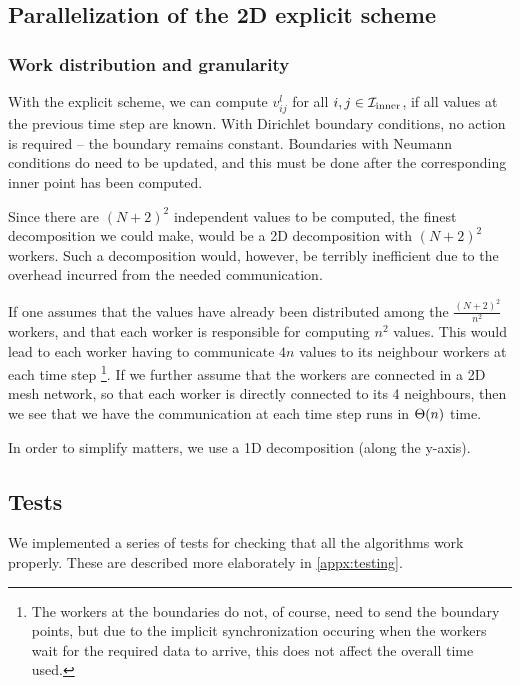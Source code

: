 \subsection{Parallelization of the 2D explicit scheme}
\subsubsection{Work distribution and granularity}
\cite{inf3380_bok}
With the explicit scheme, we can compute $v_{ij}^l$ for all $i, j \in \mathcal{I}_{\mathrm{inner}}$, if all values at the previous time step are known. With Dirichlet boundary conditions, no action is required -- the boundary remains constant. Boundaries with Neumann conditions do need to be updated, and this must be done after the corresponding inner point has been computed.

Since there are $(N+2)^2$ independent values to be computed, the finest decomposition we could make, would be a 2D decomposition with $(N+2)^2$ workers. Such a decomposition would, however, be terribly inefficient due to the overhead incurred from the needed communication.

If one assumes that the values have already been distributed among the $\frac{(N+2)^2}{n^2}$ workers, and that each worker is responsible for computing $n^2$ values. This would lead to each worker having to communicate $4n$ values to its neighbour workers at each time step \footnote{The workers at the boundaries do not, of course, need to send the boundary points, but due to the implicit synchronization occuring when the workers wait for the required data to arrive, this does not affect the overall time used.}.
If we further assume that the workers are connected in a 2D mesh network, so that each worker is directly connected to its 4 neighbours, then we see that we have the communication at each time step runs in $\Theta (n)$ time.

In order to simplify matters, we use a 1D decomposition (along the y-axis).


\subsection{Tests}
We implemented a series of tests for checking that all the algorithms work properly. These are described more elaborately in \vref*{appx:testing}.
